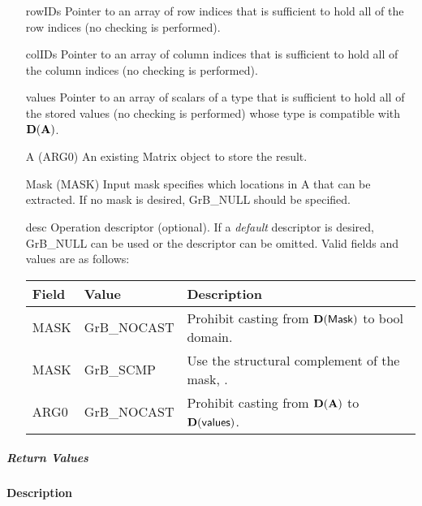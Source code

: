 \begin{itemize}[leftmargin=1.1in]
	\item[{\sf rowIDs}] Pointer to an array of row indices that is sufficient to
                        hold all of the row indices (no checking is performed).
	\item[{\sf colIDs}] Pointer to an array of column indices that is sufficient to
                        hold all of the column indices (no checking is performed). 
	\item[{\sf values}] Pointer to an array of scalars of a type that is sufficient to
                        hold all of the stored values (no checking is performed) whose
                        type is compatible with $\bold{D}({\bf A})$.
    \item[{\sf A}]      ({\sf ARG0}) An existing Matrix object to store the result.
    \item[{\sf Mask}]   ({\sf MASK}) Input mask specifies which locations in
                        {\sf A} that can be extracted.  If no mask is desired,
	                    {\sf GrB\_NULL} should be specified.
	\item[{\sf desc}]   Operation descriptor (optional). If a
	\emph{default} descriptor is desired, {\sf GrB\_NULL} can be
	used or the descriptor can be omitted.  Valid fields and values are as follows: \\
    \begin{tabular}{lll}
    Field  & Value & Description \\
    \hline
    {\sf MASK} & {\sf GrB\_NOCAST} & Prohibit casting from $\bold{D}({\sf Mask})$ to {\sf bool} domain. \\
    {\sf MASK} & {\sf GrB\_SCMP}   & Use the structural complement of the mask, . \\
    {\sf ARG0} & {\sf GrB\_NOCAST} & Prohibit casting from $\bold{D}({\bf A})$ to $\bold{D}({\sf values})$. \\
    \end{tabular}
\end{itemize}

\subparagraph{Return Values}

\paragraph{Description}
